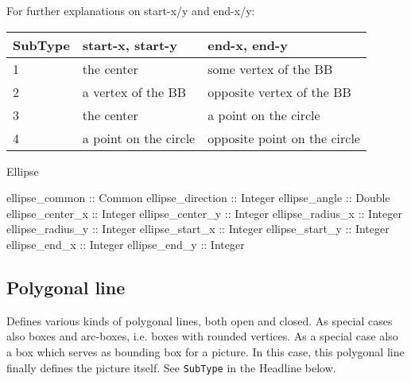 \documentclass[10pt, a4paper]{article}
\begin{document}
\noindent
For further explanations on start-x/y and end-x/y: \\
%
\begin{tabular}{|lll|}
\hline
SubType  & start-x, start-y  & end-x, end-y \\
\hline
\hline
1 & the center            & some vertex of the BB \\
2 & a vertex of the BB    & opposite vertex of the BB \\
3 & the center            & a point on the circle \\
4 & a point on the circle & opposite point on the circle \\
\hline
\end{tabular}

Ellipse	 

ellipse\_common :: Common
ellipse\_direction :: Integer
ellipse\_angle :: Double
ellipse\_center\_x :: Integer
ellipse\_center\_y :: Integer
ellipse\_radius\_x :: Integer
ellipse\_radius\_y :: Integer
ellipse\_start\_x :: Integer
ellipse\_start\_y :: Integer
ellipse\_end\_x :: Integer
ellipse\_end\_y :: Integer

\subsection{Polygonal line}\label{subsec:polyline}

Defines various kinds of polygonal lines, both open and closed. 
As special cases also boxes and arc-boxes, i.e. boxes with rounded vertices. 
As a special case also a box which serves as bounding box for a picture. 
In this case, this polygonal line finally defines the picture itself. 
See {\tt SubType} in the Headline below. 
\end{document}
